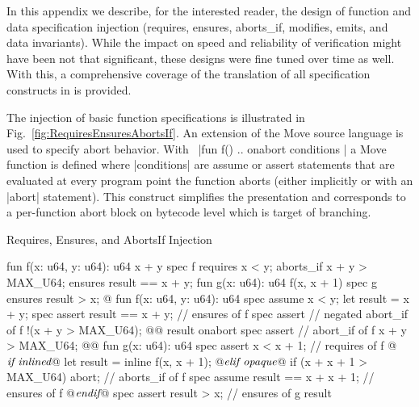 
In this appendix we describe, for the interested reader, the design of function
and data specification injection (requires, ensures, aborts\_if, modifies,
emits, and data invariants).  While the impact on speed and reliability of
verification might have been not that significant, these designs were fine tuned
over time as well. With this, a comprehensive coverage of the translation of all
specification constructs in \MVP is provided.


The injection of basic function specifications is illustrated in
Fig.~\ref{fig:RequiresEnsuresAbortsIf}.  An extension of the Move source
language is used to specify abort behavior. With~%
|fun f() { .. } onabort { conditions }| a Move function is defined where
|conditions| are assume or assert statements that are evaluated at every program
point the function aborts (either implicitly or with an |abort| statement). This
construct simplifies the presentation and corresponds to a per-function abort
block on bytecode level which is target of branching.

\begin{Figure}
  \caption{Requires, Ensures, and AbortsIf Injection}
  \label{fig:RequiresEnsuresAbortsIf}
  \centering
\begin{MoveBoxNumbered}
  fun f(x: u64, y: u64): u64 { x + y }
  spec f {
    requires x < y;
    aborts_if x + y > MAX_U64;
    ensures result == x + y;
  }
  fun g(x: u64): u64 { f(x, x + 1) }
  spec g {
    ensures result > x;
  }
  @\transform@
  fun f(x: u64, y: u64): u64 {
    spec assume x < y;
    let result = x + y;
    spec assert result == x + y;     // ensures of f
    spec assert                      // negated abort_if of f
      !(x + y > MAX_U64); @\label{line:aborts_holds_not}@
    result
  } onabort {
    spec assert                      // abort_if of f
      x + y > MAX_U64; @\label{line:aborts_holds}@
  }
  fun g(x: u64): u64 {
    spec assert x < x + 1;           // requires of f
@$\textrm{\it if inlined}$\label{line:inline}@
    let result = inline f(x, x + 1);
@$\textrm{\it elif opaque}$\label{line:opaque}@
    if (x + x + 1 > MAX_U64) abort;  // aborts_if of f
    spec assume result == x + x + 1; // ensures of f
@$\textrm{\it endif}$@
    spec assert result > x;          // ensures of g
    result
  }
\end{MoveBoxNumbered}
\end{Figure}

